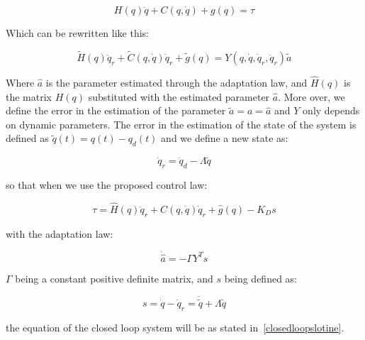\documentclass[journal]{IEEEtran}
\begin{document}
        \begin{equation}
            H(q) \ddot{q} + C(q, \dot{q}) + g(q) = \tau
        \end{equation}

        Which can be rewritten like this:

        \begin{equation} \label{closedloopslotine}
            \tilde{H}(q) \ddot{q}_r + \tilde{C}(q, \dot{q}) \dot{q}_r + \tilde{g}(q) = Y(q, \dot{q}, \dot{q}_r, \ddot{q}_r) \tilde{a}
        \end{equation}

        Where $\hat{a}$ is the parameter estimated through the adaptation law, and $\hat{H}(q)$ is the matrix $H(q)$ substituted with the estimated parameter $\hat{a}$. More over, we define the error in the estimation of the parameter $\tilde{a} = a = \hat{a}$ and $Y$ only depends on dynamic parameters. The error in the estimation of the state of the system is defined as $\tilde{q}(t) = q(t) - q_d(t)$ and we define a new state as:

        \begin{equation}
            \dot{q}_r = \dot{q}_d - \Lambda \tilde{q}
        \end{equation}

        so that when we use the proposed control law:

        \begin{equation}
            \tau = \hat{H}(q) \ddot{q}_r + \hat{C}(q, \dot{q}) \dot{q}_r + \hat{g}(q) - K_D s
        \end{equation}

        with the adaptation law:

        \begin{equation}
            \dot{\hat{a}} = - \Gamma Y^T s
        \end{equation}

        $\Gamma$ being a constant positive definite matrix, and $s$ being defined as:

        \begin{equation}
            s = \dot{q} - \dot{q}_r = \dot{\tilde{q}} + \Lambda \tilde{q}
        \end{equation}

        the equation of the closed loop system will be as stated in~\ref{closedloopslotine}.

\end{document}
